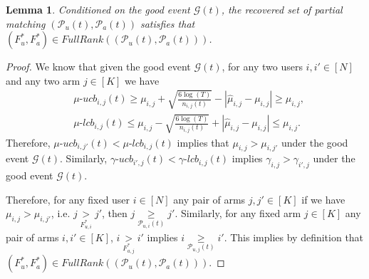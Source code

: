 \documentclass{article}
\newtheorem{lemma}[theorem]{Lemma}
\newcommand\uucb{\mu\text{-}ucb}
\newcommand\ulcb{\mu\text{-}lcb}
\newcommand\aucb{\gamma\text{-}ucb}
\newcommand\alcb{\gamma\text{-}lcb}
\begin{document}
\begin{lemma}\label{lemm:contains-true}
    Conditioned on the good event $\mathcal{G}(t)$, the recovered set of partial matching $(\mathcal{P}_{u}(t), \mathcal{P}_{a}(t))$ satisfies that  $(F^*_u, F^*_a) \in FullRank((\mathcal{P}_{u}(t), \mathcal{P}_{a}(t)))$.  
\end{lemma}
\begin{proof}
    We know that given the good event $\mathcal{G}(t)$, for any two users $i, i'\in [N]$ and any two arm $j \in [K]$ we have 
    \begin{align*}
        & \uucb_{i, j}(t) \geq \mu_{i,j} +  \sqrt{\tfrac{6\log(T)}{n_{i,j}(t)}}  - |\hat{\mu}_{i,j} - \mu_{i,j}| \geq \mu_{i,j}, \\
        & \ulcb_{i, j}(t) \leq \mu_{i,j} -  \sqrt{\tfrac{6\log(T)}{n_{i,j}(t)}}  + |\hat{\mu}_{i,j} - \mu_{i,j}| \leq \mu_{i,j}.
    \end{align*}
    Therefore, $\uucb_{i, j'}(t) < \ulcb_{i, j}(t)$ implies that $\mu_{i,j} > \mu_{i, j'}$ under the good event $\mathcal{G}(t)$. Similarly,  $\aucb_{i',j}(t) < \alcb_{i, j}(t)$ implies $\gamma_{i,j} > \gamma_{i', j}$ under the good event $\mathcal{G}(t)$.

    
    Therefore, for any fixed user $i \in [N]$ any pair of arms $j, j' \in [K]$ if we have $\mu_{i,j} > \mu_{i, j'}$, i.e. $j \underset{F^*_{u,i}}{>} j'$,  then $j \underset{\mathcal{P}_{u, i}(t)}{\geq} j'$. Similarly, for any fixed arm $j \in [K]$ any pair of arms $i, i' \in [K]$, $i \underset{F^*_{a,j}}{>} i'$ implies $i \underset{\mathcal{P}_{u, j}(t)}{\geq} i'$. This implies by definition that $(F^*_u, F^*_a) \in FullRank((\mathcal{P}_{u}(t), \mathcal{P}_{a}(t)))$.
\end{proof}
\end{document}
